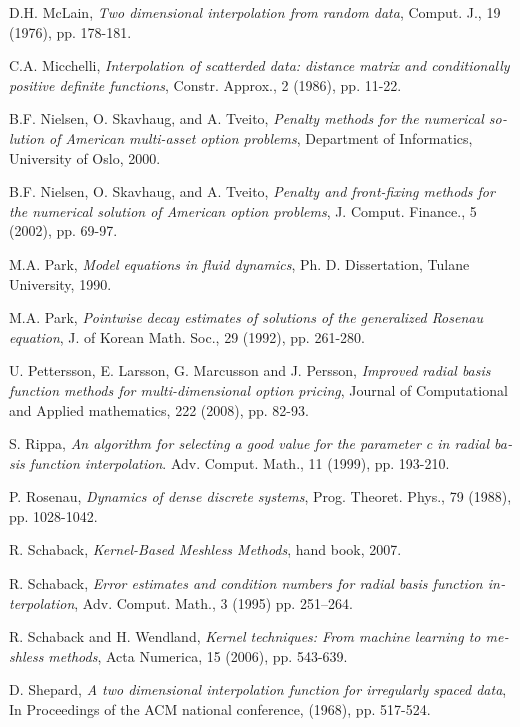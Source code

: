 \begin{thebibliography}{99}
\begin{latin}
\bibitem{[14]} {\sc D.H. McLain}, {\em Two dimensional interpolation from random data}, Comput.
J., 19 (1976), pp. 178-181.

\bibitem{[16]}  {\sc C.A. Micchelli},  {\em Interpolation of scatterded data:
distance matrix and conditionally positive definite functions},
Constr. Approx., 2 (1986), pp. 11-22.

\bibitem{[58]} {\sc B.F. Nielsen, O. Skavhaug, and A. Tveito},
{\em Penalty methods for the numerical solution of American
multi-asset option problems}, Department of Informatics,
University of Oslo, 2000.

\bibitem{[59]} {\sc B.F. Nielsen, O. Skavhaug, and A.
Tveito}, {\em Penalty and front-fixing methods for the numerical
solution of American option problems}, J. Comput. Finance., 5
(2002), pp. 69-97.

\bibitem{[44]} {\sc M.A. Park}, {\em Model equations in fluid dynamics}, Ph. D. Dissertation,
Tulane University, 1990.

\bibitem {[45]} {\sc M.A. Park}, {\em Pointwise decay estimates of solutions of the
generalized Rosenau equation}, J. of Korean Math. Soc., 29 (1992),
pp. 261-280.

\bibitem{[56]} {\sc U. Pettersson, E. Larsson, G. Marcusson and J. Persson}, {\em Improved radial basis function methods for
multi-dimensional option pricing}, Journal of Computational and
Applied mathematics, 222 (2008), pp. 82-93.

\bibitem{[6]} {\sc S. Rippa}, {\em An algorithm for selecting a good value for the parameter c in radial
basis function interpolation}. Adv. Comput. Math., 11 (1999), pp.
193-210.

\bibitem{[41]} {\sc P. Rosenau}, {\em Dynamics of dense discrete systems}, Prog. Theoret.
Phys., 79 (1988), pp. 1028-1042.

\bibitem{[72]} {\sc R. Schaback}, {\em Kernel-Based Meshless Methods}, hand
book, 2007.

\bibitem{[10]} {\sc R. Schaback}, {\em Error estimates and condition numbers for radial
basis function interpolation}, Adv. Comput. Math., 3 (1995) pp.
251–264.

\bibitem {[33]} {\sc R. Schaback and H. Wendland}, {\em Kernel techniques: From machine learning to meshless methods},
Acta Numerica, 15 (2006), pp. 543-639.

\bibitem{[13]} {\sc D. Shepard}, {\em A two dimensional interpolation function for irregularly spaced
data}, In Proceedings of the ACM national conference, (1968), pp.
517-524.


\end{latin}
\end{thebibliography}
